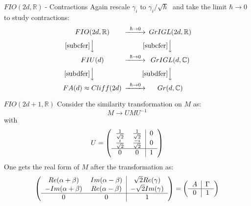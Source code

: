 \documentclass[pdf,colorBG,slideColor,fyma]{prosper}
\newcommand{\beq}{\[}
\newcommand{\eeq}{\]}
\def\IC{\mathbb{C}}
\def\IR{\mathbb{R}}
\def\FIO{$FIO(2d, \IR)\;$}
\begin{document}

\begin{slide}{\FIO - Contractions}
Again rescale $\gamma_i$ to $\gamma_i/\sqrt{\hbar}\;$ and take the limit
$\hbar \rightarrow 0$ to study contractions:
    \[
    \begin{CD}
    {FIO(2d, \IR)}            @> \hbar \rightarrow 0   >> {GrIGL(2d, \IR)} \\
    @V\eqref{subcfer}VV                                    @V\eqref{subcfer}VV \\
    {FIU(d)}                  @> \hbar \rightarrow 0   >> {GrIGL(d, \IC)} \\
    @V\eqref{subdfer}VV                                    @V\eqref{subdfer}VV \\
    {FA(d) \approx Cliff(2d)} @> \hbar \rightarrow 0    >> {Gr(d, \IC)}
    \end{CD}
    \]
\end{slide}


\begin{slide}{$FIO(2d + 1, \IR)$}
Consider the similarity transformation on $M$ as:
\[
M \rightarrow UMU^{-1}
\]
with
\beq U = \left(
\begin{tabular}{cc|c}
$\frac{1}{\sqrt{2}}$ & $\frac{1}{\sqrt{2}}$ & $0$ \\
$\frac{i}{\sqrt{2}}$ & $\frac{-i}{\sqrt{2}}$ & $0$ \\
\hline $0$ & $0$ & $1$
\end{tabular}
\right)
\eeq
One gets the real form of $M$ after the transformation as:
\beq
\left(
\begin{tabular}{cc|c}
$Re(\alpha + \beta)$ & $Im(\alpha - \beta)$ & $\sqrt{2}Re(\gamma)$ \\
$-Im(\alpha + \beta)$ & $Re(\alpha - \beta)$ & $-\sqrt{2}Im(\gamma)$ \\
\hline $0$ & $0$ & $1$
\end{tabular}
\right) = \left(
\begin{tabular}{c|c}
$A$ & $\Gamma$ \\
\hline $0$ & $1$
\end{tabular}
\right)
\eeq
\end{slide}

\end{document}
